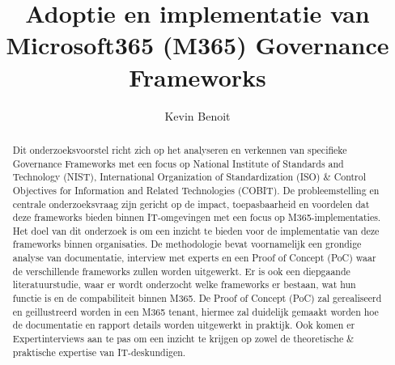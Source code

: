 \documentclass{hogent-article}
\title{Adoptie en implementatie van Microsoft365 (M365) Governance Frameworks}
\author{Kevin Benoit}
\begin{document}
\begin{abstract}
Dit onderzoeksvoorstel richt zich op het analyseren en verkennen van specifieke Governance Frameworks met een focus op National Institute of Standards and Technology (NIST), International Organization of Standardization (ISO) \& Control Objectives for Information and Related Technologies (COBIT). De probleemstelling en centrale onderzoeksvraag zijn gericht op de impact, toepasbaarheid en voordelen dat deze frameworks bieden binnen IT-omgevingen met een focus op M365-implementaties. Het doel van dit onderzoek is om een inzicht te bieden voor de implementatie van deze frameworks binnen organisaties.  De methodologie bevat voornamelijk een grondige analyse van documentatie, interview met experts en een Proof of Concept (PoC) waar de verschillende frameworks zullen worden uitgewerkt. Er is ook een diepgaande literatuurstudie, waar er wordt onderzocht welke frameworks er bestaan, wat hun functie is en de compabiliteit binnen M365.
De Proof of Concept (PoC) zal gerealiseerd en geillustreerd worden in een M365 tenant, hiermee zal duidelijk gemaakt worden hoe de documentatie en rapport details worden uitgewerkt in praktijk. Ook komen er Expertinterviews aan te pas om een inzicht te krijgen op zowel de theoretische \& praktische expertise van IT-deskundigen.

\end{abstract}

\tableofcontents



\printbibliography[heading=bibintoc]
\end{document}
